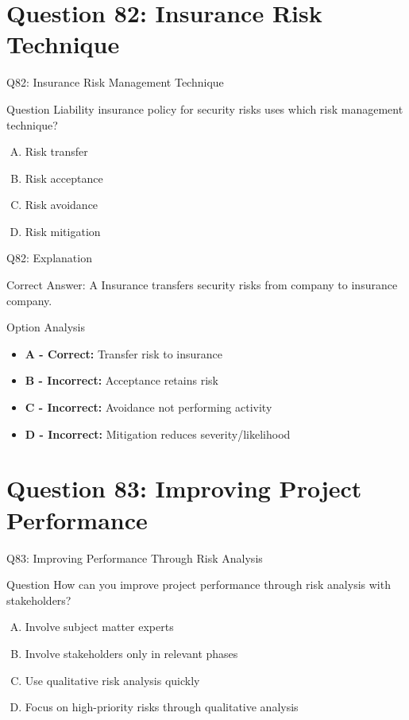 \documentclass{beamer}
\begin{document}
	\section{Question 82: Insurance Risk Technique}
	
	\begin{frame}{Q82: Insurance Risk Management Technique}
		\begin{block}{Question}
			Liability insurance policy for security risks uses which risk management technique?
		\end{block}
		\begin{enumerate}[(A)]
			\item Risk transfer
			\item Risk acceptance
			\item Risk avoidance
			\item Risk mitigation
		\end{enumerate}
	\end{frame}
	
	\begin{frame}{Q82: Explanation}
		\begin{block}{Correct Answer: A}
			Insurance transfers security risks from company to insurance company.
		\end{block}
		\begin{block}{Option Analysis}
			\begin{itemize}
				\item \textbf{A - Correct:} Transfer risk to insurance
				\item \textbf{B - Incorrect:} Acceptance retains risk
				\item \textbf{C - Incorrect:} Avoidance not performing activity
				\item \textbf{D - Incorrect:} Mitigation reduces severity/likelihood
			\end{itemize}
		\end{block}
	\end{frame}
	
	\section{Question 83: Improving Project Performance}
	
	\begin{frame}{Q83: Improving Performance Through Risk Analysis}
		\begin{block}{Question}
			How can you improve project performance through risk analysis with stakeholders?
		\end{block}
		\begin{enumerate}[(A)]
			\item Involve subject matter experts
			\item Involve stakeholders only in relevant phases
			\item Use qualitative risk analysis quickly
			\item Focus on high-priority risks through qualitative analysis
		\end{enumerate}
	\end{frame}
	
\end{document}

